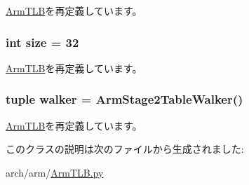 \hyperlink{classArmTLB_1_1ArmTLB_a79c1ca5c107632a64c9583c96fbcc282}{ArmTLB}を再定義しています。\hypertarget{classArmTLB_1_1ArmStage2TLB_a439227feff9d7f55384e8780cfc2eb82}{
\subsubsection[{size}]{\setlength{\rightskip}{0pt plus 5cm}int {\bf size} = 32}}
\label{classArmTLB_1_1ArmStage2TLB_a439227feff9d7f55384e8780cfc2eb82}


\hyperlink{classArmTLB_1_1ArmTLB_a377e5da8df1f89c5468c8b8cd07eac89}{ArmTLB}を再定義しています。\hypertarget{classArmTLB_1_1ArmStage2TLB_a38c6e2cd4db9b456da7637543e59ccbe}{
\subsubsection[{walker}]{\setlength{\rightskip}{0pt plus 5cm}tuple {\bf walker} = {\bf ArmStage2TableWalker}()}}
\label{classArmTLB_1_1ArmStage2TLB_a38c6e2cd4db9b456da7637543e59ccbe}


\hyperlink{classArmTLB_1_1ArmTLB_a38c6e2cd4db9b456da7637543e59ccbe}{ArmTLB}を再定義しています。

このクラスの説明は次のファイルから生成されました:\begin{DoxyCompactItemize}
\item 
arch/arm/\hyperlink{ArmTLB_8py}{ArmTLB.py}\end{DoxyCompactItemize}
